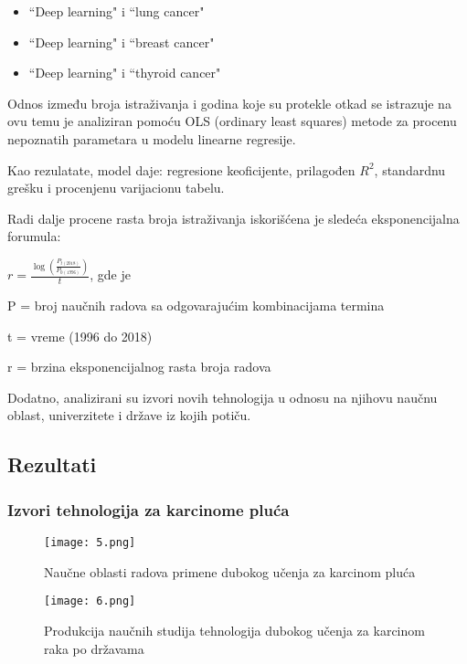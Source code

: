 \documentclass[a4paper]{article}
\begin{document}
\begin{itemize}
    \item ``Deep learning" i ``lung cancer"
    \item ``Deep learning" i ``breast cancer"
    \item ``Deep learning" i ``thyroid cancer"
\end{itemize}

Odnos između broja istraživanja i godina koje su protekle otkad se istrazuje na ovu temu je analiziran pomoću OLS (ordinary least squares) metode za procenu nepoznatih parametara u modelu linearne regresije.

Kao rezulatate, model daje: regresione keoficijente, prilagođen \begin{math}R^2\end{math}, standardnu grešku i procenjenu varijacionu tabelu.

Radi dalje procene rasta broja istraživanja iskorišćena je sledeća eksponencijalna forumula:

\begin{math}r = \frac{\log(\frac{P_{t(2018)}}{P_{0(1996)}})}{t}\end{math}, gde je

P = broj naučnih radova sa odgovarajućim kombinacijama termina

t = vreme (1996 do 2018)

r = brzina eksponencijalnog rasta broja radova

\bigskip

Dodatno, analizirani su izvori novih tehnologija u odnosu na njihovu naučnu oblast, univerzitete i države iz kojih potiču.


\subsection{Rezultati}
\label{subsec:podnaslov4}

\FloatBarrier
\subsubsection{Izvori tehnologija za karcinome pluća}
\label{subsec:ppnaslov2}



\begin{figure}[hbt!]
\centering
\texttt{[image: 5.png]}
\caption{Naučne oblasti radova primene dubokog učenja za karcinom pluća}
\end{figure}


\begin{figure}[hbt!]
\centering
\texttt{[image: 6.png]}
\caption{Produkcija naučnih studija tehnologija dubokog učenja za karcinom raka po državama}
\end{figure}
\end{document}
